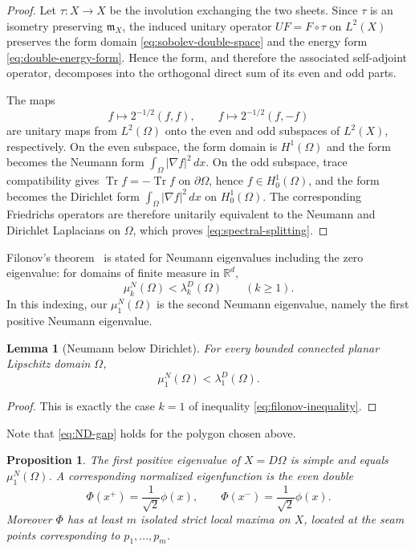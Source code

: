 \documentclass[11pt]{amsart}
\newtheorem{proposition}[theorem]{Proposition}
\newtheorem{lemma}[theorem]{Lemma}
\numberwithin{equation}{section}
\DeclareMathOperator{\Tr}{Tr}
\newcommand{\R}{\mathbb R}
\newcommand{\Om}{\Omega}
\newcommand{\mm}{\mathfrak m}
\begin{document}
\begin{proof}
Let $\tau:X\to X$ be the involution exchanging the two sheets.  Since $\tau$ is an
isometry preserving $\mm_X$, the induced unitary operator $UF=F\circ\tau$ on
$L^2(X)$ preserves the form domain \eqref{eq:sobolev-double-space} and the energy
form \eqref{eq:double-energy-form}.  Hence the form, and therefore the associated
self-adjoint operator, decomposes into the orthogonal direct sum of its even and
odd parts.

The maps
$$
f\longmapsto 2^{-1/2}(f,f),
\qquad
f\longmapsto 2^{-1/2}(f,-f)
$$
are unitary maps from $L^2(\Om)$ onto the even and odd subspaces of $L^2(X)$,
respectively.  On the even subspace, the form domain is $H^1(\Om)$ and the form
becomes the Neumann form $\int_\Om |\nabla f|^2\,dx$.  On the odd subspace,
trace compatibility gives $\Tr f=-\Tr f$ on $\partial\Om$, hence
$f\in H_0^1(\Om)$, and the form becomes the Dirichlet form
$\int_\Om |\nabla f|^2\,dx$ on $H_0^1(\Om)$.  The corresponding Friedrichs
operators are therefore unitarily equivalent to the Neumann and Dirichlet
Laplacians on $\Om$, which proves \eqref{eq:spectral-splitting}.
\end{proof}

Filonov's theorem~\cite[main theorem]{Filonov} is stated for Neumann eigenvalues
including the zero eigenvalue: for domains of finite measure in $\R^d$,
\begin{equation}\label{eq:filonov-inequality}
\mu_k^N(\Om)<\lambda_k^D(\Om)\qquad(k\ge1).
\end{equation}
In this indexing, our $\mu_1^N(\Om)$ is the second Neumann eigenvalue, namely the
first positive Neumann eigenvalue.


\begin{lemma}[Neumann below Dirichlet]\label{lem:ND-gap}
For every bounded connected planar Lipschitz domain $\Om$,
\begin{equation}\label{eq:ND-gap}
\mu_1^N(\Om)<\lambda_1^D(\Om).
\end{equation}
\end{lemma}

\begin{proof}
This is exactly the case $k=1$ of inequality
\eqref{eq:filonov-inequality}.
\end{proof}

Note that \eqref{eq:ND-gap} holds for the polygon chosen above.

\begin{proposition}\label{prop:limit-spectrum}
The first positive eigenvalue of $X=D\Om$ is simple and equals $\mu_1^N(\Om)$.
A corresponding normalized eigenfunction is the even double
\begin{equation}\label{eq:even-double-eigenfunction}
\Phi(x^+)=\frac{1}{\sqrt2}\phi(x),
\qquad
\Phi(x^-)=\frac{1}{\sqrt2}\phi(x).
\end{equation}
Moreover $\Phi$ has at least $m$ isolated strict local maxima on $X$, located at
the seam points corresponding to $p_1,\ldots,p_m$.
\end{proposition}
\end{document}
